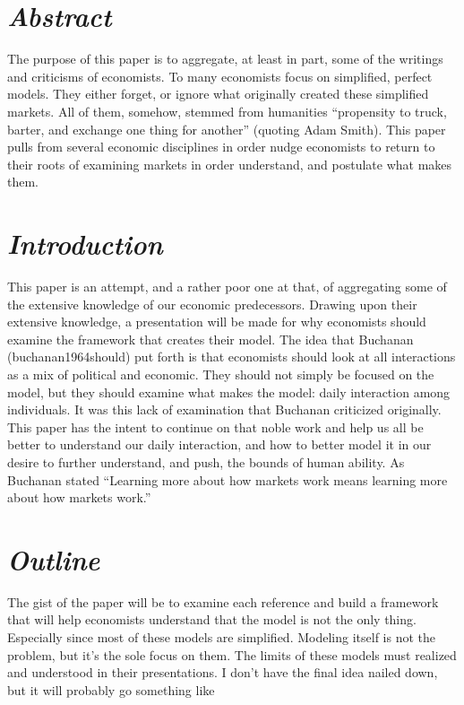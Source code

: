 \documentclass[11pt,]{article}
\begin{document}
\section{\texorpdfstring{\emph{Abstract}}{Abstract}}\label{abstract}

The purpose of this paper is to aggregate, at least in part, some of the
writings and criticisms of economists. To many economists focus on
simplified, perfect models. They either forget, or ignore what
originally created these simplified markets. All of them, somehow,
stemmed from humanities ``propensity to truck, barter, and exchange one
thing for another'' \citet{buchanan1964should}(quoting Adam Smith). This
paper pulls from several economic disciplines in order nudge economists
to return to their roots of examining markets in order understand, and
postulate what makes them.

\section{\texorpdfstring{\emph{Introduction}}{Introduction}}\label{introduction}

This paper is an attempt, and a rather poor one at that, of aggregating
some of the extensive knowledge of our economic predecessors. Drawing
upon their extensive knowledge, a presentation will be made for why
economists should examine the framework that creates their model. The
idea that Buchanan (buchanan1964should) put forth is that economists
should look at all interactions as a mix of political and economic. They
should not simply be focused on the model, but they should examine what
makes the model: daily interaction among individuals. It was this lack
of examination that Buchanan criticized originally. This paper has the
intent to continue on that noble work and help us all be better to
understand our daily interaction, and how to better model it in our
desire to further understand, and push, the bounds of human ability. As
Buchanan stated ``Learning more about how markets work means learning
more about how markets work.'' \citet{buchanan1964should}

\section{\texorpdfstring{\emph{Outline}}{Outline}}\label{outline}

The gist of the paper will be to examine each reference and build a
framework that will help economists understand that the model is not the
only thing. Especially since most of these models are simplified.
Modeling itself is not the problem, but it's the sole focus on them. The
limits of these models must realized and understood in their
presentations. I don't have the final idea nailed down, but it will
probably go something like
\end{document}
